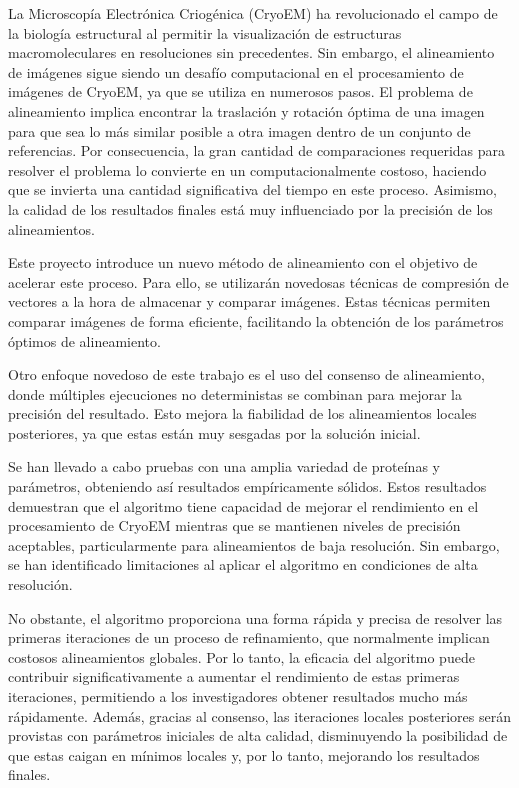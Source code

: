 \documentclass[../main.tex]{subfiles}
\begin{document}
La Microscopía Electrónica Criogénica (CryoEM) ha revolucionado el campo de la biología estructural al permitir la visualización de estructuras macromoleculares en resoluciones sin precedentes. Sin embargo, el alineamiento de imágenes sigue siendo un desafío computacional en el procesamiento de imágenes de CryoEM, ya que se utiliza en numerosos pasos. El problema de alineamiento implica encontrar la traslación y rotación óptima de una imagen para que sea lo más similar posible a otra imagen dentro de un conjunto de referencias. Por consecuencia, la gran cantidad de comparaciones requeridas para resolver el problema lo convierte en un computacionalmente costoso, haciendo que se invierta una cantidad significativa del tiempo en este proceso. Asimismo, la calidad de los resultados finales está muy influenciado por la precisión de los alineamientos.

Este proyecto introduce un nuevo método de alineamiento con el objetivo de acelerar este proceso. Para ello, se utilizarán novedosas técnicas de compresión de vectores a la hora de almacenar y comparar imágenes. Estas técnicas permiten comparar imágenes de forma eficiente, facilitando la obtención de los parámetros óptimos de alineamiento.

Otro enfoque novedoso de este trabajo es el uso del consenso de alineamiento, donde múltiples ejecuciones no deterministas se combinan para mejorar la precisión del resultado. Esto mejora la fiabilidad de los alineamientos locales posteriores, ya que estas están muy sesgadas por la solución inicial.

Se han llevado a cabo pruebas con una amplia variedad de proteínas y parámetros, obteniendo así resultados empíricamente sólidos. Estos resultados demuestran que el algoritmo tiene capacidad de mejorar el rendimiento en el procesamiento de CryoEM mientras que se mantienen niveles de precisión aceptables, particularmente para alineamientos de baja resolución. Sin embargo, se han identificado limitaciones al aplicar el algoritmo en condiciones de alta resolución.

No obstante, el algoritmo proporciona una forma rápida y precisa de resolver las primeras iteraciones de un proceso de refinamiento, que normalmente implican costosos alineamientos globales. Por lo tanto, la eficacia del algoritmo puede contribuir significativamente a aumentar el rendimiento de estas primeras iteraciones, permitiendo a los investigadores obtener resultados mucho más rápidamente. Además, gracias al consenso, las iteraciones locales posteriores serán provistas con parámetros iniciales de alta calidad, disminuyendo la posibilidad de que estas caigan en mínimos locales y, por lo tanto, mejorando los resultados finales.
\end{document}
